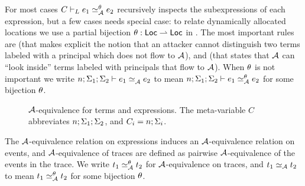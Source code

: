 For most cases $\loweql{C}{\Attacker}[\bijection]{\expr_1}{\expr_2}$ recursively inspects the subexpressions of each expression, but a few cases needs special case: to relate dynamically allocated locations we use a partial bijection \cite{Banerjee:2002:SIF:794201.795164, Rajani2018} $\theta: \mathsf{Loc} \rightharpoonup \mathsf{Loc}$ in . The most important rules are  (that makes explicit the notion that an attacker cannot distinguish two terms labeled with a principal which does not flow to $\mathcal{A}$), and  (that states that $\mathcal{A}$ can ``look inside'' terms labeled with principals that flow to $\mathcal{A}$). When $\theta$ is not important we write $\loweq{n; \env_1; \env_2}{\Attacker}{\expr_1}{\expr_2}$ to mean $\loweq{n; \env_1; \env_2}{\Attacker}[\bijection]{\expr_1}{\expr_2}$ for some bijection $\theta$.

\begin{figure}
    \centering
    \caption{$\mathcal{A}$-equivalence for terms and expressions. The meta-variable $C$ abbreviates $n; \Sigma_1; \Sigma_2$, and $C_i = n; \Sigma_i$.}
    \label{fig:low-eq-expr}
\end{figure}

The $\mathcal{A}$-equivalence relation on expressions induces an $\mathcal{A}$-equivalence relation on events, and $\mathcal{A}$-equivalence of traces are defined as pairwise $\mathcal{A}$-equivalence of the events in the trace. We write $t_1 \simeq_{\mathcal{A}}^{\theta} t_2$ for $\mathcal{A}$-equivalence on traces, and $t_1 \simeq_{\mathcal{A}} t_2$ to mean $t_1 \simeq_{\mathcal{A}}^{\theta} t_2$ for some bijection $\theta$.

